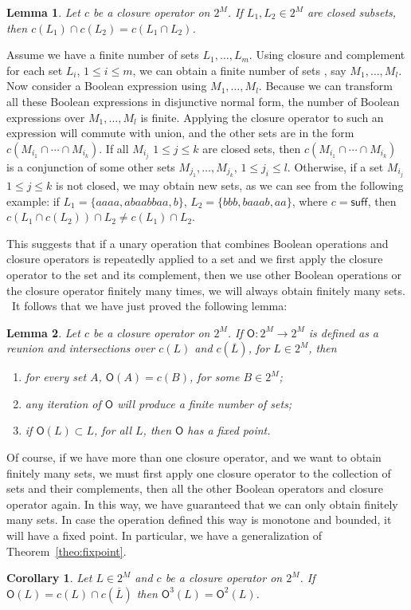 \documentclass{article}
\newtheorem{lemma}{Lemma}
\newtheorem{corollary}{Corollary}
\newcommand{\comp}[1]{\overline{#1}}
\newcommand{\suffo}{\mathsf{suff}}
\newcommand{\bcop}[1]{\mathsf{O}(#1)}
\newcommand{\bcopo}{\mathsf{O}}
\newcommand{\bcopn}[2]{\mathsf{O}^{#2}(#1)}
\begin{document}
\begin{lemma}  
\label{lkcap}
Let $c$ be a closure operator on $2^M$.
 If $L_1,L_2\in 2^M$ are closed subsets,  then
$c(L_1)\cap c(L_2)=c(L_1\cap L_2)$.
\end{lemma}
Assume we have a finite number of sets $L_1, \ldots, L_m$.
Using closure and complement for each set $L_i$, 
$1\leq i\leq m$, we can obtain a 
finite number of sets \cite{Kuratowski1922}, say
  $M_1, \ldots,M_l$.
  Now consider a Boolean expression using $M_1, \ldots,M_l$.
Because we can transform all these Boolean expressions in
disjunctive normal form, the number of Boolean expressions
over $M_1, \ldots,M_l$ is finite.
Applying the closure operator to such an expression 
will commute with union, and the other sets 
are in the form 
$c(M_{i_1}\cap\cdots \cap M_{i_k})$.
If all $M_{i_j}$ $1\leq j\leq k$ are closed sets,
then   
$c(M_{i_1}\cap\cdots \cap M_{i_k})$ is a conjunction of 
some other sets $M_{j_1}, \ldots,M_{j_k}$, $1\leq j_i\leq l$.
Otherwise, if a set $M_{i_j}$ $1\leq j\leq k$ is not closed,
we may obtain new sets, as we can see from the following example:
if 
 $L_1=\{aaaa,abaabbaa,b\}$, $L_2=\{bbb,baaab,aa\}$, where $c=\suffo$,
then
 $c(L_1\cap c(L_2))\cap L_2\neq c(L_1)\cap L_2$.

This suggests that if a unary operation that combines Boolean 
operations and closure operators
is repeatedly applied to a set and we first apply the closure 
operator to the set and its complement, 
then we use other Boolean operations or the closure operator
finitely many times, we will always obtain  finitely many sets.
\ It follows that we have just proved the following lemma:
\begin{lemma}
\label{lem:fixgen}
Let  $c$ be a closure operator on $2^M$. If  $\bcopo:2^M\longrightarrow 2^M$ is defined as
a  reunion and intersections over $c(L)$ and $c(\comp{L})$, for $L\in 2^M$,
then 
\begin{enumerate}
\item for every set $A$, $\bcop{A}=c(B)$, for some $B\in 2^M$;
\item any iteration of $\bcopo$ will produce a finite number of sets;
\item if $\bcop{L} \subset L$, for all $L$, then $\bcopo$ has a fixed point. 
\end{enumerate}
\end{lemma}
 
Of course, if we have more than one closure operator, and we want to obtain 
finitely many sets,
we must first apply one closure operator to the collection of sets and their
 complements,
 then all the other Boolean operators and closure operator again.
In this way, we have guaranteed that we can only obtain finitely many sets.
In case the operation defined this way is monotone and bounded, it will have 
a fixed point.
In particular, we have a generalization of Theorem~\ref{theo:fixpoint}.
\begin{corollary}
\label{cor:ot}
Let $L\in 2^M$ and $c$ be a closure operator on $2^M$. 
If $\bcop{L}=c(L)\cap c(\comp{L})$ then $\bcopn{L}{3}=\bcopn{L}{2}$.
\end{corollary}
\end{document}
